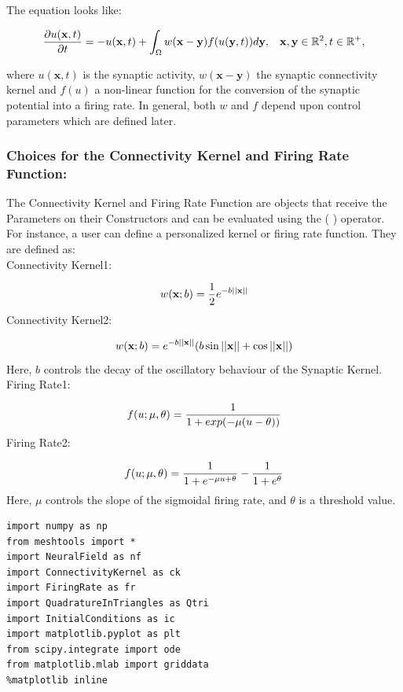 \documentclass{uonmathreport}
\begin{document}
The equation looks like:

\begin{equation}
\frac{\partial u(\mathbf{x},t)}{\partial t} = - u(\mathbf{x},t) + \int_{\Omega} w(\mathbf{x}-\mathbf{y})f(u(\mathbf{y}, t)) d\mathbf{y}, \hspace{3mm} \mathbf{x}, \mathbf{y} \in \mathbb{R}^2, t \in \mathbb{R}^+,
\end{equation}

where \(u(\mathbf{x},t)\) is the synaptic activity,
\(w(\mathbf{x}-\mathbf{y})\) the synaptic connectivity kernel and
\(f(u)\) a non-linear function for the conversion of the synaptic
potential into a firing rate. In general, both \(w\) and \(f\) depend
upon control parameters which are defined later.

\subsubsection{Choices for the Connectivity Kernel and Firing Rate Function:}\label{choices-for-the-connectivity-kernel-and-firing-rate-function}

The Connectivity Kernel and Firing Rate Function are objects that
receive the Parameters on their Constructors and can be evaluated using
the ( ) operator. For instance, a user can define a personalized kernel
or firing rate function. They are defined as:\\
Connectivity Kernel1:

\[ w(\textbf{x};b) = \frac{1}{2} e^{-b||\textbf{x}||}\\\] Connectivity
Kernel2:

\[ w(\textbf{x}; b) = e^{-b||\textbf{x}||}(b \sin{||\textbf{x}||} + \cos{||\textbf{x}||}) \\\]
Here, \(b\) controls the decay of the oscillatory behaviour of the
Synaptic Kernel.\\
Firing Rate1:

\[ f(u; \mu, \theta) = \frac{1}{1+exp(-\mu(u-\theta))} \\\] Firing
Rate2:

\[ f(u; \mu, \theta) = \frac{1}{1+e^{-\mu u + \theta}} - \frac{1}{1+e^\theta}\\\]
Here, \(\mu\) controls the slope of the sigmoidal firing rate, and
\(\theta\) is a threshold value.

\begin{verbatim}
import numpy as np
from meshtools import *
import NeuralField as nf
import ConnectivityKernel as ck
import FiringRate as fr
import QuadratureInTriangles as Qtri
import InitialConditions as ic
import matplotlib.pyplot as plt
from scipy.integrate import ode
from matplotlib.mlab import griddata
%matplotlib inline
\end{verbatim}
\end{document}
